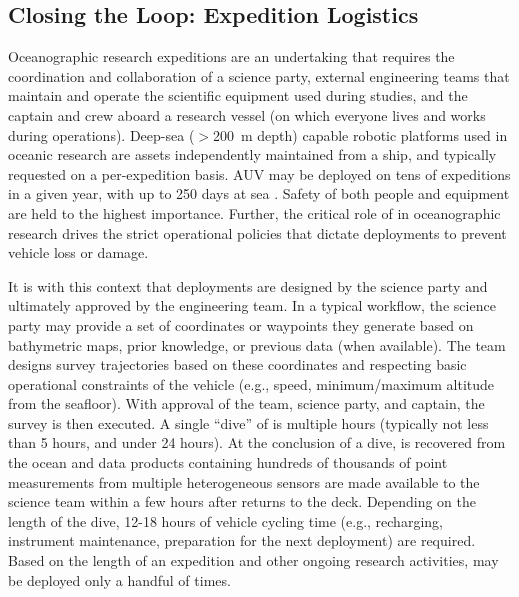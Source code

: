 \subsection{Closing the Loop: Expedition Logistics}
Oceanographic research expeditions are an undertaking that requires the coordination and collaboration of a science party, external engineering teams that maintain and operate the scientific equipment used during studies, and the captain and crew aboard a research vessel (on which everyone lives and works during operations). Deep-sea ($>$\SI{200}{\meter} depth) capable robotic platforms used in oceanic research are assets independently maintained from a ship, and typically requested on a per-expedition basis. AUV \Sentry may be deployed on tens of expeditions in a given year, with up to 250 days at sea \autocite{kaiser2016design}. Safety of both people and equipment are held to the highest importance. Further, the critical role of \Sentry in oceanographic research drives the strict operational policies that dictate \Sentry deployments to prevent vehicle loss or damage.

It is with this context that \Sentry deployments are designed by the science party and ultimately approved by the \Sentry engineering team. In a typical workflow, the science party may provide a set of coordinates or waypoints they generate based on bathymetric maps, prior knowledge, or previous data (when available). The \Sentry team designs survey trajectories based on these coordinates and respecting basic operational constraints of the vehicle (e.g., speed, minimum/maximum altitude from the seafloor). With approval of the \Sentry team, science party, and captain, the survey is then executed. A single ``dive'' of \Sentry is multiple hours (typically not less than 5 hours, and under 24 hours). At the conclusion of a dive, \Sentry is recovered from the ocean and data products containing hundreds of thousands of point measurements from multiple heterogeneous sensors are made available to the science team within a few hours after \Sentry returns to the deck. Depending on the length of the dive, 12-18 hours of vehicle cycling time (e.g., recharging, instrument maintenance, preparation for the next deployment) are required. Based on the length of an expedition and other ongoing research activities, \Sentry may be deployed only a handful of times.

